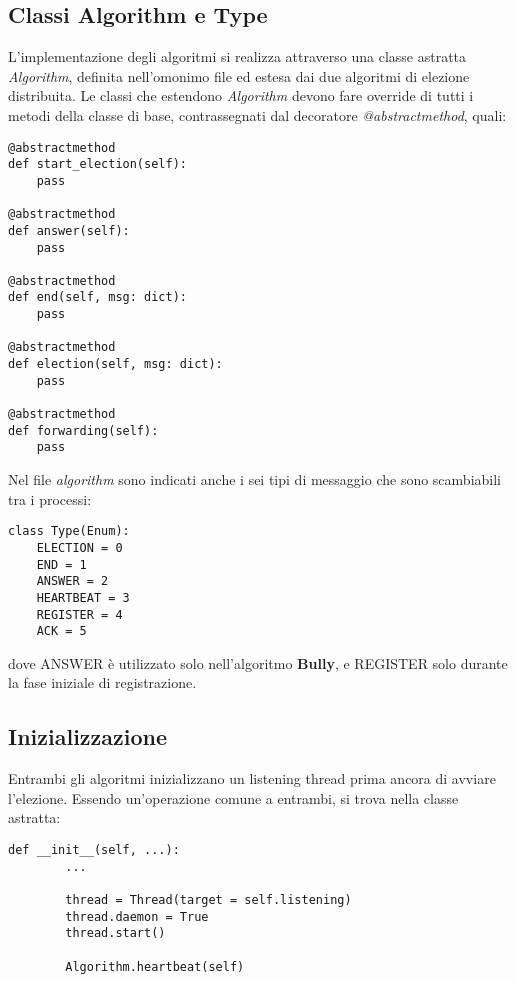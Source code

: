 \documentclass[conference]{IEEEtran}
\begin{document}
\subsection{Classi Algorithm e Type}\label{algorithm}

L'implementazione degli algoritmi si realizza attraverso una classe astratta \textit{Algorithm}, definita nell'omonimo file ed estesa dai due algoritmi di elezione distribuita.
Le classi che estendono \textit{Algorithm} devono fare override di tutti i metodi della classe di base, contrassegnati dal decoratore \textit{@abstractmethod}, quali:

\begin{lstlisting}
@abstractmethod
def start_election(self):
    pass

@abstractmethod
def answer(self):
    pass

@abstractmethod
def end(self, msg: dict):
    pass

@abstractmethod
def election(self, msg: dict):
    pass

@abstractmethod
def forwarding(self):
    pass
\end{lstlisting}

Nel file \textit{algorithm} sono indicati anche i sei tipi di messaggio che sono scambiabili tra i processi:

\begin{lstlisting}
class Type(Enum):
    ELECTION = 0
    END = 1
    ANSWER = 2
    HEARTBEAT = 3
    REGISTER = 4
    ACK = 5
\end{lstlisting}

dove ANSWER è utilizzato solo nell'algoritmo \textbf{Bully}, e REGISTER solo durante la fase iniziale di registrazione.


\subsection{Inizializzazione}\label{init}

Entrambi gli algoritmi inizializzano un listening thread prima ancora di avviare l'elezione. Essendo un'operazione comune a entrambi, si trova nella classe astratta:

\begin{lstlisting}
def __init__(self, ...):
        ...
        
        thread = Thread(target = self.listening)
        thread.daemon = True
        thread.start()

        Algorithm.heartbeat(self)
\end{lstlisting}
\end{document}
